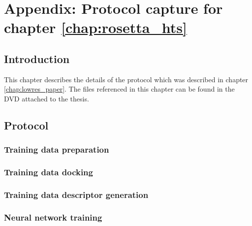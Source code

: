 \chapter{Appendix:  Protocol capture for chapter \ref{chap:rosetta_hts}}

\section{Introduction}

This chapter describes the details of the protocol which was described in chapter \ref{chap:lowres_paper}.
The files referenced in this chapter can be found in the DVD attached to the thesis.


\section{Protocol}

\subsection{Training data preparation}

\subsection{Training data docking}

\subsection{Training data descriptor generation}

\subsection{Neural network training}

